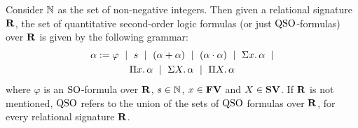 
Consider $\mathbb{N}$ as the set of non-negative integers. Then given a relational signature $\mathbf{R}$, the set of quantitative second-order logic formulas (or just ${\rm QSO}$-formulas) over $\mathbf{R}$ is given by the following grammar:
\begin{multline}
\label{eq-def-qso}
\alpha := \varphi \ \mid \ s \ \mid \ (\alpha \add \alpha) \ \mid\ (\alpha \mult \alpha) \ \mid \ \sa{x} \alpha \ \mid \\ \pa{x} \alpha \ \mid \ \sa{X} \alpha \ \mid \ \pa{X} \alpha 
\end{multline}
where $\varphi$ is an ${\rm SO}$-formula over $\mathbf{R}$, $s \in \mathbb{N}$, $x \in \mathbf{FV}$ and $X \in \mathbf{SV}$. If $\mathbf{R}$ is not mentioned, ${\rm QSO}$ refers to the union of the sets of ${\rm QSO}$ formulas over $\mathbf{R}$, for every relational signature $\mathbf{R}$.

